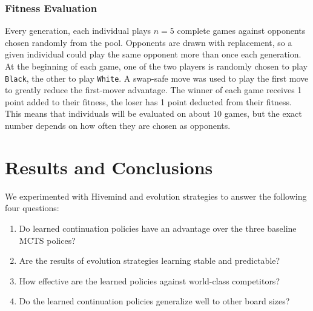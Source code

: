 \documentclass{acm_proc_article-sp}
\newcommand{\hblack}{\texttt{Black}}
\newcommand{\hwhite}{\texttt{White}}
\begin{document}
\subsubsection*{Fitness Evaluation}

Every generation, each individual plays $n=5$ complete games against opponents chosen  randomly from the pool.
Opponents are drawn with replacement, so a given individual could play the same opponent more than once each generation. 
At the beginning of each game, one of the two players is randomly chosen to play \hblack, the other to play \hwhite. 
A swap-safe move was used to play the first move to greatly reduce the first-mover advantage. 
The winner of each game receives 1 point added to their fitness, the loser has 1 point deducted from their fitness.
This means that individuals will be evaluated on about $10$ games, but the exact number depends on how often they are
chosen as opponents.

\section{Results and Conclusions}\label{results}

We experimented with Hivemind and evolution strategies to answer the following four questions:
\begin{enumerate}
\item Do learned continuation policies have an advantage over the three baseline MCTS polices?
\item Are the results of evolution strategies learning stable and predictable?
\item How effective are the learned policies against world-class competitors?
\item Do the learned continuation policies generalize well to other board sizes?
\end{enumerate}
\end{document}

